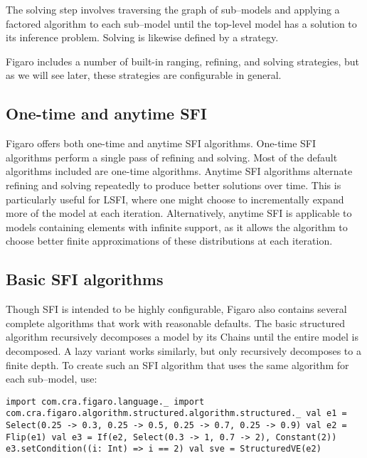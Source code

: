 The solving step involves traversing the graph of sub--models and applying a factored algorithm to each sub--model until the top-level model has a solution to its inference problem. Solving is likewise defined by a strategy.

Figaro includes a number of built-in ranging, refining, and solving strategies, but as we will see later, these strategies are configurable in general.

\subsection{One-time and anytime SFI}

Figaro offers both one-time and anytime SFI algorithms. One-time SFI algorithms perform a single pass of refining and solving. Most of the default algorithms included are one-time algorithms. Anytime SFI algorithms alternate refining and solving repeatedly to produce better solutions over time. This is particularly useful for LSFI, where one might choose to incrementally expand more of the model at each iteration. Alternatively, anytime SFI is applicable to models containing elements with infinite support, as it allows the algorithm to choose better finite approximations of these distributions at each iteration.

\subsection{Basic SFI algorithms}

Though SFI is intended to be highly configurable, Figaro also contains several complete algorithms that work with reasonable defaults. The basic structured algorithm recursively decomposes a model by its Chains until the entire model is decomposed. A lazy variant works similarly, but only recursively decomposes to a finite depth. To create such an SFI algorithm that uses the same algorithm for each sub--model, use:

\begin{flushleft}
\texttt{import com.cra.figaro.language.\_
\newline import com.cra.figaro.algorithm.structured.algorithm.structured.\_
\newline 
\newline val e1 = Select(0.25 -> 0.3, 0.25 -> 0.5, 0.25 -> 0.7, 0.25 -> 0.9)
\newline val e2 = Flip(e1)
\newline val e3 = If(e2, Select(0.3 -> 1, 0.7 -> 2), Constant(2))
\newline e3.setCondition((i: Int) => i == 2)
\newline 
\newline val sve = StructuredVE(e2)
}
\end{flushleft}

